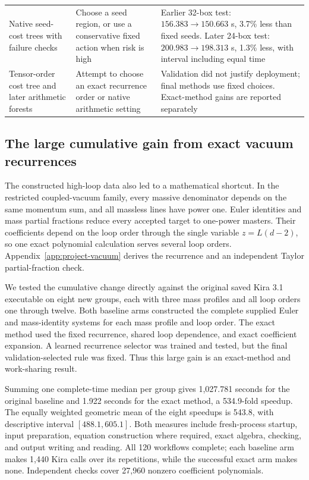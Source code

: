 \begin{table}[!htbp]
\begin{tabularx}{\linewidth}{@{}>{\raggedright\arraybackslash}p{3.4cm}YY@{}}
Native seed-cost trees with failure checks & Choose a seed region, or use a conservative fixed action when risk is high & Earlier 32-box test: $156.383\to150.663$ s, 3.7\% less than fixed seeds. Later 24-box test: $200.983\to198.313$ s, 1.3\% less, with interval including equal time\\
Tensor-order cost tree and later arithmetic forests & Attempt to choose an exact recurrence order or native arithmetic setting & Validation did not justify deployment; final methods use fixed choices. Exact-method gains are reported separately\\\bottomrule
\end{tabularx}
\end{table}

\subsection{The large cumulative gain from exact vacuum recurrences}
\label{sec:project-vacuum-results}
The constructed high-loop data also led to a mathematical shortcut. In the restricted coupled-vacuum family, every massive denominator depends on the same momentum sum, and all massless lines have power one. Euler identities and mass partial fractions reduce every accepted target to one-power masters. Their coefficients depend on the loop order through the single variable $z=L(d-2)$, so one exact polynomial calculation serves several loop orders. Appendix~\ref{app:project-vacuum} derives the recurrence and an independent Taylor partial-fraction check.

We tested the cumulative change directly against the original saved Kira 3.1 executable on eight new groups, each with three mass profiles and all loop orders one through twelve. Both baseline arms constructed the complete supplied Euler and mass-identity systems for each mass profile and loop order. The exact method used the fixed recurrence, shared loop dependence, and exact coefficient expansion. A learned recurrence selector was trained and tested, but the final validation-selected rule was fixed. Thus this large gain is an exact-method and work-sharing result.

Summing one complete-time median per group gives 1,027.781 seconds for the original baseline and 1.922 seconds for the exact method, a 534.9-fold speedup. The equally weighted geometric mean of the eight speedups is 543.8, with descriptive interval $[488.1,605.1]$. Both measures include fresh-process startup, input preparation, equation construction where required, exact algebra, checking, and output writing and reading. All 120 workflows complete; each baseline arm makes 1,440 Kira calls over its repetitions, while the successful exact arm makes none. Independent checks cover 27,960 nonzero coefficient polynomials.

